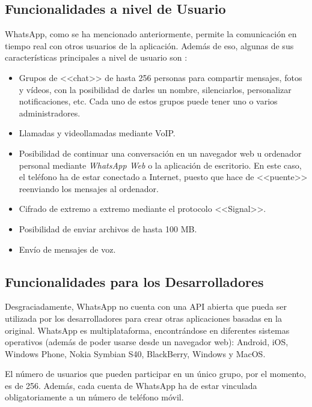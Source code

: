 \subsection{Funcionalidades a nivel de Usuario}
WhatsApp, como se ha mencionado anteriormente, permite la comunicación en tiempo real con otros usuarios de la aplicación. Además de eso, algunas de sus características principales a nivel de usuario son \cite{WhatsApp2017}:

\begin{itemize}
	\item Grupos de <<chat>> de hasta 256 personas para compartir mensajes, fotos y vídeos, con la posibilidad de darles un nombre, silenciarlos, personalizar notificaciones, etc. Cada uno de estos grupos puede tener uno o varios administradores.
	\item Llamadas y videollamadas mediante \acf{VoIP}.
	\item Posibilidad de continuar una conversación en un navegador web u ordenador personal mediante \textit{WhatsApp Web} o la aplicación de escritorio. En este caso, el teléfono ha de estar conectado a Internet, puesto que hace de <<puente>> reenviando los mensajes al ordenador.
	\item Cifrado de extremo a extremo mediante el protocolo <<Signal>>.
	\item Posibilidad de enviar archivos de hasta 100 \acf{MB}.
	\item Envío de mensajes de voz.
\end{itemize}

\subsection{Funcionalidades para los Desarrolladores}
Desgraciadamente, WhatsApp no cuenta con una \acs{API} abierta que pueda ser utilizada por los desarrolladores para crear otras aplicaciones basadas en la original. WhatsApp es multiplataforma, encontrándose en diferentes sistemas operativos (además de poder usarse desde un navegador web): Android, iOS, Windows Phone, Nokia Symbian S40, BlackBerry, Windows y MacOS.

El número de usuarios que pueden participar en un único grupo, por el momento, es de 256. Además, cada cuenta de WhatsApp ha de estar vinculada obligatoriamente a un número de teléfono móvil.

\newpage


